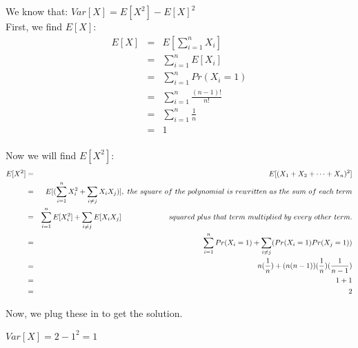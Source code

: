 \documentclass{article}
\begin{document}
We know that: ${ Var[X] = E[X^2] - E[X]^2 }$ \\

First, we find ${E[X]}$: \\

\begin{eqnarray*}
    E[X] & = & E[ \sum_{i=1}^n X_i ] \\
         & = & \sum_{i=1}^n E[ X_i ] \\
         & = & \sum_{i=1}^n Pr(X_i = 1) \\
         & = & \sum_{i=1}^n \frac{(n-1)!}{n!} \\
         & = & \sum_{i=1}^n \frac{1}{n} \\
         & = & 1 \\
\end{eqnarray*}

Now we will find ${E[X^2]}$: \\

\begin{eqnarray*}
    E[X^2] & = & E[ (X_1 + X_2 + \dots + X_{n})^2 ] \\
           & = & E[ (\sum_{i=1}^n X_i^2 + \sum_{i\neq j} X_iX_{j} ) ], \  the\ square\ of\ the\ polynomial\ is\ rewritten\ as\ the\ sum\ of\ each\ term\\ 
           & = & \sum_{i=1}^n E[X_i^2] + \sum_{i\neq j} E[X_iX_{j}] \hspace{15ex} squared\ plus\ that\ term\ multiplied\ by\ every\ other\ term. \\
           & = & \sum_{i=1}^n Pr(X_i = 1) + \sum_{i\neq j} ( Pr(X_i = 1) Pr(X_{j} = 1) )  \\
           & = & n ( \frac{1}{n} ) + ( n(n-1)) (\frac{1}{n}) (\frac{1}{n-1}) \\
           & = & 1 + 1 \\
           & = & 2 \\
\end{eqnarray*}

Now, we plug these in to get the solution. \\

\begin{center}
    ${\boxed{Var[X] = 2 - 1^2 = 1 } }$ \\
\end{center}
\end{document}
